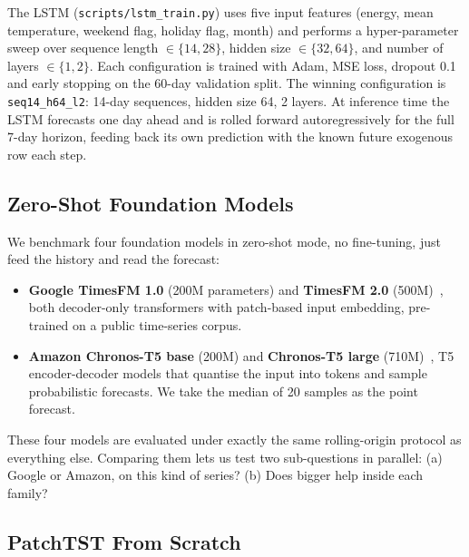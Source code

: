The LSTM (\texttt{scripts/lstm\_train.py}) uses five input features
(energy, mean temperature, weekend flag, holiday flag, month) and
performs a hyper-parameter sweep over sequence length
$\in \{14, 28\}$, hidden size $\in \{32, 64\}$, and number of layers
$\in \{1, 2\}$. Each configuration is trained with Adam, MSE loss,
dropout 0.1 and early stopping on the 60-day validation split. The
winning configuration is \texttt{seq14\_h64\_l2}: 14-day sequences,
hidden size 64, 2 layers. At inference time the LSTM forecasts one
day ahead and is rolled forward autoregressively for the full 7-day
horizon, feeding back its own prediction with the known future
exogenous row each step.

\subsection{Zero-Shot Foundation Models}

We benchmark four foundation models in zero-shot mode, no fine-tuning,
just feed the history and read the forecast:
\begin{itemize}[leftmargin=*]
    \item \textbf{Google TimesFM 1.0} (200M parameters) and
    \textbf{TimesFM 2.0} (500M)~\cite{das2024timesfm}, both
    decoder-only transformers with patch-based input embedding,
    pre-trained on a public time-series corpus.
    \item \textbf{Amazon Chronos-T5 base} (200M) and
    \textbf{Chronos-T5 large} (710M)~\cite{ansari2024chronos}, T5
    encoder-decoder models that quantise the input into tokens and
    sample probabilistic forecasts. We take the median of 20 samples
    as the point forecast.
\end{itemize}
These four models are evaluated under exactly the same rolling-origin
protocol as everything else. Comparing them lets us test two
sub-questions in parallel: (a) Google or Amazon, on this kind of
series? (b) Does bigger help inside each family?

\subsection{PatchTST From Scratch}

